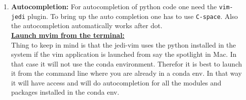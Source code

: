 \documentclass{article}
\begin{document}
\begin{enumerate}
    \item {\bfseries Autocompletion:} For autocompletion of python code one need
        the \verb!vim-jedi! plugin. To bring up the auto completion one has to
        use \verb!C-space!. Also the autocompletion automatically works after
        dot.\\ 

        \underline{\bfseries Launch mvim from the terminal:}\\
        Thing to keep in mind is that the jedi-vim uses the
        python installed in the system if the vim application is launched from
        say the spotlight in Mac. In that case it will not use the conda
        environment. Therefor it is best to launch it from the command line where you
        are already in a conda env. In that way it will have access and will do
        autocompletion for all the modules and packages installed in the conda env.\\


\end{enumerate}
\end{document}
